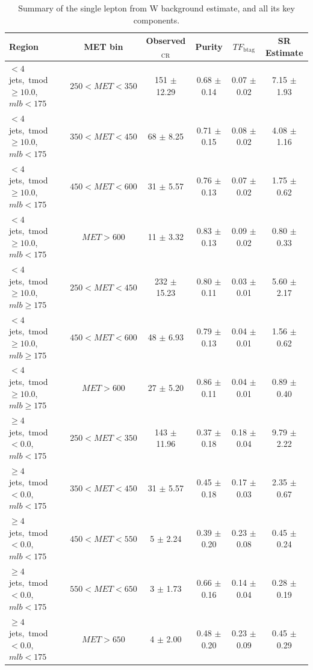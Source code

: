 \begin{table}
\centering
\small
\caption{Summary of the single lepton from W background estimate, and
  all its key components.}
\label{tab:stop:1lw:results}
\begin{tabular}{|l|c|c|c|c|c|} \hline
Region & MET bin & Observed$_\text{CR}$ & Purity & $TF_\text{btag}$ & SR Estimate \\ \hline \hline
 $<4$jets,~tmod$\ge10.0$,~$mlb<175$ & $250<MET<350$  & 151 $\pm$ 12.29  & 0.68 $\pm$ 0.14  & 0.07 $\pm$ 0.02  & 7.15 $\pm$ 1.93  \\
 $<4$jets,~tmod$\ge10.0$,~$mlb<175$ & $350<MET<450$  & 68 $\pm$ 8.25  & 0.71 $\pm$ 0.15  & 0.08 $\pm$ 0.02  & 4.08 $\pm$ 1.16  \\
 $<4$jets,~tmod$\ge10.0$,~$mlb<175$ & $450<MET<600$  & 31 $\pm$ 5.57  & 0.76 $\pm$ 0.13  & 0.07 $\pm$ 0.02  & 1.75 $\pm$ 0.62  \\
 $<4$jets,~tmod$\ge10.0$,~$mlb<175$ & $MET>600$      & 11 $\pm$ 3.32  & 0.83 $\pm$ 0.13  & 0.09 $\pm$ 0.02  & 0.80 $\pm$ 0.33  \\
\hline
 $<4$jets,~tmod$\ge10.0$,~$mlb\ge175$ & $250<MET<450$  & 232 $\pm$ 15.23  & 0.80 $\pm$ 0.11  & 0.03 $\pm$ 0.01  & 5.60 $\pm$ 2.17  \\
 $<4$jets,~tmod$\ge10.0$,~$mlb\ge175$ & $450<MET<600$  & 48 $\pm$ 6.93  & 0.79 $\pm$ 0.13  & 0.04 $\pm$ 0.01  & 1.56 $\pm$ 0.62  \\
 $<4$jets,~tmod$\ge10.0$,~$mlb\ge175$ & $MET>600$      & 27 $\pm$ 5.20  & 0.86 $\pm$ 0.11  & 0.04 $\pm$ 0.01  & 0.89 $\pm$ 0.40  \\
\hline
 $\ge4$jets,~tmod$<0.0$,~$mlb<175$ & $250<MET<350$  & 143 $\pm$ 11.96  & 0.37 $\pm$ 0.18  & 0.18 $\pm$ 0.04  & 9.79 $\pm$ 2.22  \\
 $\ge4$jets,~tmod$<0.0$,~$mlb<175$ & $350<MET<450$  & 31 $\pm$ 5.57  & 0.45 $\pm$ 0.18  & 0.17 $\pm$ 0.03  & 2.35 $\pm$ 0.67  \\
 $\ge4$jets,~tmod$<0.0$,~$mlb<175$ & $450<MET<550$  & 5 $\pm$ 2.24  & 0.39 $\pm$ 0.20  & 0.23 $\pm$ 0.08  & 0.45 $\pm$ 0.24  \\
 $\ge4$jets,~tmod$<0.0$,~$mlb<175$ & $550<MET<650$  & 3 $\pm$ 1.73  & 0.66 $\pm$ 0.16  & 0.14 $\pm$ 0.04  & 0.28 $\pm$ 0.19  \\
 $\ge4$jets,~tmod$<0.0$,~$mlb<175$ & $MET>650$      & 4 $\pm$ 2.00  & 0.48 $\pm$ 0.20  & 0.23 $\pm$ 0.09  & 0.45 $\pm$ 0.29  \\

\end{tabular}
\end{table}
